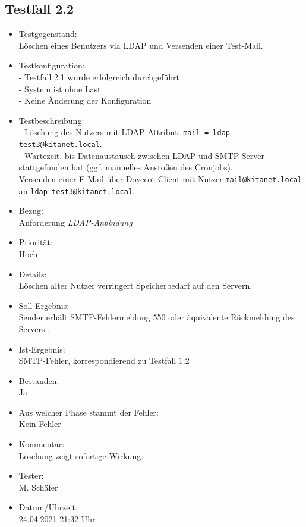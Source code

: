 \subsection{Testfall 2.2}
\begin{itemize}
	\item Testgegenstand:\\
	Löschen eines Benutzers via LDAP und Versenden einer Test-Mail.
	\item Testkonfiguration:\\
	- Testfall 2.1 wurde erfolgreich durchgeführt\\
	- System ist ohne Last\\
	- Keine Änderung der Konfiguration
	\item Testbeschreibung:\\
	- Löschung des Nutzers mit LDAP-Attribut: \verb+mail = ldap-test3@kitanet.local+.\\
	- Wartezeit, bis Datenaustausch zwischen LDAP und SMTP-Server stattgefunden hat (ggf. manuelles Anstoßen des Cronjobs).\\
	Versenden einer E-Mail über Dovecot-Client mit Nutzer \verb+mail@kitanet.local+ \\ an \verb+ldap-test3@kitanet.local+.
	\item Bezug:\\
	Anforderung \textit{LDAP-Anbindung}
	\item Priorität:\\
	Hoch
	\item Details:\\
	Löschen alter Nutzer verringert Speicherbedarf auf den Servern.
	\item Soll-Ergebnis:\\
	Sender erhält SMTP-Fehlermeldung 550 oder äquivalente Rückmeldung des Servers \citep[vgl.][16]{rfc821}.
	\item Ist-Ergebnis:\\
	SMTP-Fehler, korrespondierend zu Testfall 1.2
	\item Bestanden:\\
	Ja
	\item Aus welcher Phase stammt der Fehler:\\
	Kein Fehler
	\item Kommentar:\\
	Löschung zeigt sofortige Wirkung. 
	\item Tester:\\
	M. Schäfer
	\item Datum/Uhrzeit:\\
	24.04.2021 21:32 Uhr
\end{itemize}




